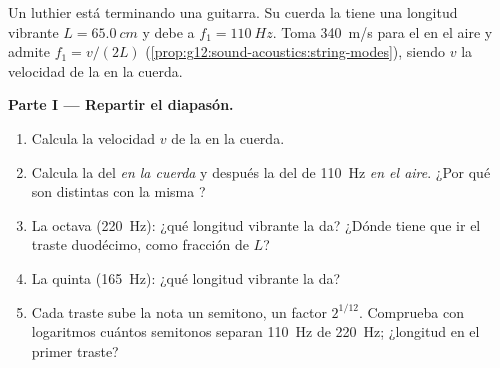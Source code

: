\begin{problem}
\label{pb:g12:sound-acoustics:1}
Un luthier está terminando una guitarra. Su cuerda la tiene una longitud
vibrante $L = \qty{65.0}{cm}$ y debe  a $f_1 = \qty{110}{Hz}$. Toma
\qty{340}{m/s} para el  en el aire y admite $f_1 = v/(2L)$
(\cref{prop:g12:sound-acoustics:string-modes}), siendo $v$ la velocidad
de la  en la cuerda.

\medskip
\noindent\textbf{Parte I --- Repartir el diapasón.}
\begin{enumerate}
  \item Calcula la velocidad $v$ de la  en la cuerda.
  \item Calcula la  del  \emph{en la cuerda}
        y después la  del  de \qty{110}{Hz}
        \emph{en el aire}. ¿Por qué son distintas con la misma
        ?
  \item La octava (\qty{220}{Hz}): ¿qué longitud vibrante la da? ¿Dónde
        tiene que ir el traste duodécimo, como fracción de $L$?
  \item La quinta (\qty{165}{Hz}): ¿qué longitud vibrante la da?
  \item Cada traste sube la nota un semitono, un factor $2^{1/12}$.
        Comprueba con logaritmos cuántos semitonos separan \qty{110}{Hz}
        de \qty{220}{Hz}; ¿longitud en el primer traste?
\end{enumerate}


\end{problem}
